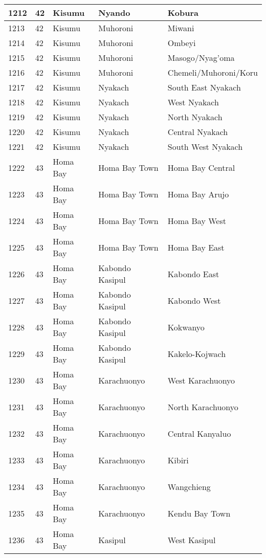 \begin{table}[!ht]
\begin{tabular}{|l|l|l|l|l|}
        1212 & 42 & Kisumu & Nyando & Kobura \\ \hline
        1213 & 42 & Kisumu & Muhoroni & Miwani \\ \hline
        1214 & 42 & Kisumu & Muhoroni & Ombeyi \\ \hline
        1215 & 42 & Kisumu & Muhoroni & Masogo/Nyag’oma \\ \hline
        1216 & 42 & Kisumu & Muhoroni & Chemeli/Muhoroni/Koru \\ \hline
        1217 & 42 & Kisumu & Nyakach & South East Nyakach \\ \hline
        1218 & 42 & Kisumu & Nyakach & West Nyakach \\ \hline
        1219 & 42 & Kisumu & Nyakach & North Nyakach \\ \hline
        1220 & 42 & Kisumu & Nyakach & Central Nyakach \\ \hline
        1221 & 42 & Kisumu & Nyakach & South West Nyakach \\ \hline
        1222 & 43 & Homa Bay & Homa Bay Town & Homa Bay Central \\ \hline
        1223 & 43 & Homa Bay & Homa Bay Town & Homa Bay Arujo \\ \hline
        1224 & 43 & Homa Bay & Homa Bay Town & Homa Bay West \\ \hline
        1225 & 43 & Homa Bay & Homa Bay Town & Homa Bay East \\ \hline
        1226 & 43 & Homa Bay & Kabondo Kasipul & Kabondo East \\ \hline
        1227 & 43 & Homa Bay & Kabondo Kasipul & Kabondo West \\ \hline
        1228 & 43 & Homa Bay & Kabondo Kasipul & Kokwanyo \\ \hline
        1229 & 43 & Homa Bay & Kabondo Kasipul & Kakelo-Kojwach \\ \hline
        1230 & 43 & Homa Bay & Karachuonyo & West Karachuonyo \\ \hline
        1231 & 43 & Homa Bay & Karachuonyo & North Karachuonyo \\ \hline
        1232 & 43 & Homa Bay & Karachuonyo & Central Kanyaluo \\ \hline
        1233 & 43 & Homa Bay & Karachuonyo & Kibiri \\ \hline
        1234 & 43 & Homa Bay & Karachuonyo & Wangchieng \\ \hline
        1235 & 43 & Homa Bay & Karachuonyo & Kendu Bay Town \\ \hline
        1236 & 43 & Homa Bay & Kasipul & West Kasipul \\ \hline

\end{tabular}
\end{table}
